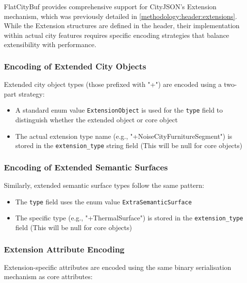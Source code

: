 FlatCityBuf provides comprehensive support for CityJSON's Extension mechanism, which was previously detailed in \autoref{methodology:header:extensions}. While the Extension structures are defined in the header, their implementation within actual city features requires specific encoding strategies that balance extensibility with performance.

\subsubsection{Encoding of Extended City Objects}
\label{methodology:feature_encoding:extension_mechanism:city_objects}

Extended city object types (those prefixed with "+") are encoded using a two-part strategy:

\begin{itemize}
  \item A standard enum value \texttt{ExtensionObject} is used for the \texttt{type} field to distinguish whether the extended object or core object
  \item The actual extension type name (e.g., "+NoiseCityFurnitureSegment") is stored in the \texttt{extension\_type} string field (This will be null for core objects)
\end{itemize}

\subsubsection{Encoding of Extended Semantic Surfaces}
\label{methodology:feature_encoding:extension_mechanism:semantic_surfaces}

Similarly, extended semantic surface types follow the same pattern:

\begin{itemize}
  \item The \texttt{type} field uses the enum value \texttt{ExtraSemanticSurface}
  \item The specific type (e.g., "+ThermalSurface") is stored in the \texttt{extension\_type} field (This will be null for core objects)
\end{itemize}

\subsubsection{Extension Attribute Encoding}
\label{methodology:feature_encoding:extension_mechanism:attributes}

Extension-specific attributes are encoded using the same binary serialisation mechanism as core attributes:

